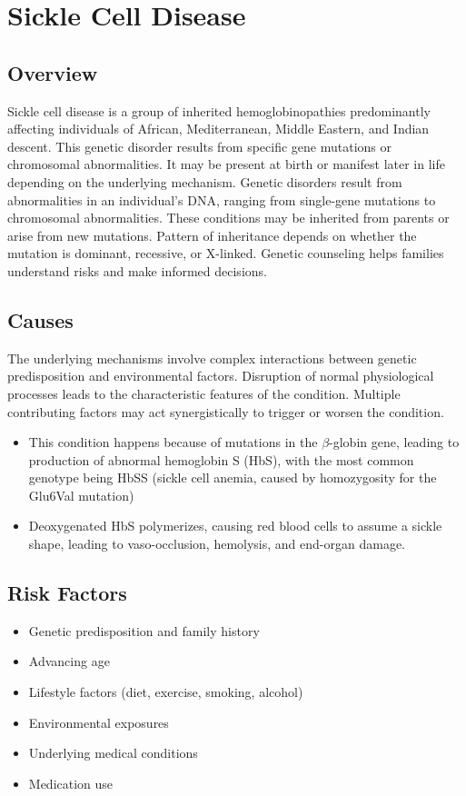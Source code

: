 \chapter{Sickle Cell Disease}
\label{sec:Sickle Cell Disease}

\section{Overview}
Sickle cell disease is a group of inherited hemoglobinopathies predominantly affecting individuals of African, Mediterranean, Middle Eastern, and Indian descent. This genetic disorder results from specific gene mutations or chromosomal abnormalities. It may be present at birth or manifest later in life depending on the underlying mechanism. Genetic disorders result from abnormalities in an individual's DNA, ranging from single-gene mutations to chromosomal abnormalities. These conditions may be inherited from parents or arise from new mutations. Pattern of inheritance depends on whether the mutation is dominant, recessive, or X-linked. Genetic counseling helps families understand risks and make informed decisions.
\section{Causes}
The underlying mechanisms involve complex interactions between genetic predisposition and environmental factors. Disruption of normal physiological processes leads to the characteristic features of the condition. Multiple contributing factors may act synergistically to trigger or worsen the condition.

\begin{itemize}[noitemsep]
  \item This condition happens because of mutations in the $\beta$-globin gene, leading to production of abnormal hemoglobin S (HbS), with the most common genotype being HbSS (sickle cell anemia, caused by homozygosity for the Glu6Val mutation)
  \item Deoxygenated HbS polymerizes, causing red blood cells to assume a sickle shape, leading to vaso-occlusion, hemolysis, and end-organ damage.
\end{itemize}
\section{Risk Factors}


\begin{itemize}[noitemsep]
  \item Genetic predisposition and family history
  \item Advancing age
  \item Lifestyle factors (diet, exercise, smoking, alcohol)
  \item Environmental exposures
  \item Underlying medical conditions
  \item Medication use
\end{itemize}
